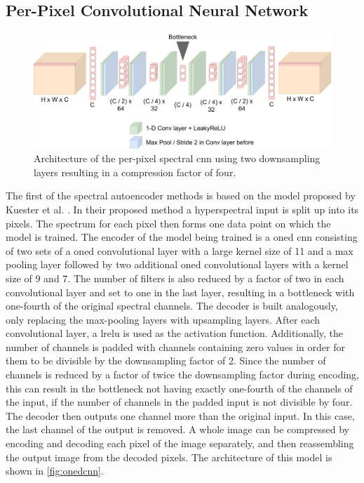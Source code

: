 \subsection{Per-Pixel Convolutional Neural Network\label{sec:conv1d}}
\begin{figure}
\centering
\includegraphics[scale=0.18]{img/OneDCNN.pdf}
\caption[Per-Pixel Spectral \Ac{cnn}]{Architecture of the per-pixel spectral \ac{cnn} \citep{kuester_1d-convolutional_2021} using two downsampling layers resulting in a compression factor of four.}
\label{fig:onedcnn}
\end{figure}
The first of the spectral autoencoder methods is based on the model proposed by Kuester et al. \citep{kuester_1d-convolutional_2021,kuester_transferability_2022}. In their proposed method a hyperspectral input is split up into its pixels. The spectrum for each pixel then forms one data point on which the model is trained. The encoder of the model being trained is a \ac{oned} \ac{cnn} consisting of two sets of a \ac{oned} convolutional layer with a large kernel size of 11 and a max pooling layer followed by two additional \ac{oned} convolutional layers with a kernel size of 9 and 7. The number of filters is also reduced by a factor of two in each convolutional layer and set to one in the last layer, resulting in a bottleneck with one-fourth of the original spectral channels. The decoder is built analogously, only replacing the max-pooling layers with upsampling layers. After each convolutional layer, a \ac{lrelu} is used as the activation function. Additionally, the number of channels is padded with channels containing zero values in order for them to be divisible by the downsampling factor of 2. Since the number of channels is reduced by a factor of twice the downsampling factor during encoding, this can result in the bottleneck not having exactly one-fourth of the channels of the input, if the number of channels in the padded input is not divisible by four. The decoder then outputs one channel more than the original input. In this case, the last channel of the output is removed. A whole image can be compressed by encoding and decoding each pixel of the image separately, and then reassembling the output image from the decoded pixels. The architecture of this model is shown in \autoref{fig:onedcnn}.

